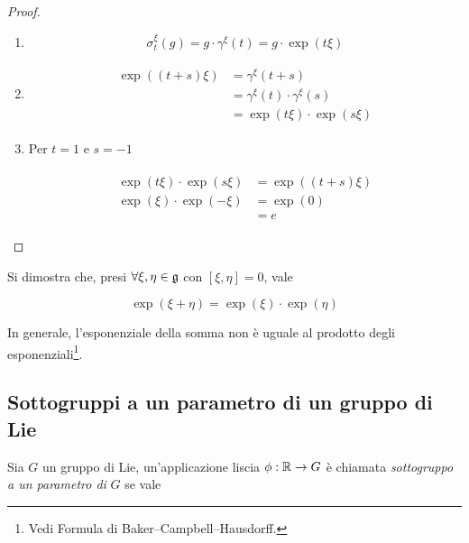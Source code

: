 \begin{proof}\hfill\break
	\begin{enumerate}
		\item %
		\begin{equation}
			\sigma_{t}^{\xi}(g) = g \cdot \gamma^{\xi}(t) = g \cdot \exp(t \xi)
		\end{equation}
		
		\item %
		\begin{align}
			\begin{split}
				\exp((t+s) \xi) &= \gamma^{\xi}(t+s)\\
				&= \gamma^{\xi}(t) \cdot \gamma^{\xi}(s)\\
				&= \exp(t \xi) \cdot \exp(s \xi)
			\end{split}
		\end{align}
		
		\item Per $ t=1 $ e $ s =-1 $
		
		\begin{align}
			\begin{split}
				\exp(t \xi) \cdot \exp(s \xi) &= \exp((t+s) \xi)\\
				\exp(\xi) \cdot \exp(-\xi) &= \exp(0)\\
				&= e
			\end{split}
		\end{align}
	\end{enumerate}
\end{proof}

\begin{remark}
	Si dimostra che, presi $ \forall \xi,\eta \in \mathfrak{g} $ con $ [\xi,\eta] = 0 $, vale
	
	\begin{equation}
		\exp(\xi + \eta) = \exp(\xi) \cdot \exp(\eta)
	\end{equation}

	In generale, l'esponenziale della somma non è uguale al prodotto degli esponenziali\footnote{%
		Vedi Formula di Baker–Campbell–Hausdorff.%
	}.
\end{remark}

\subsection{Sottogruppi a un parametro di un gruppo di Lie}

Sia $ G $ un gruppo di Lie, un'applicazione liscia $ \phi : \mathbb{R} \to G $ è chiamata \textit{sottogruppo a un parametro di} $ G $ se vale


